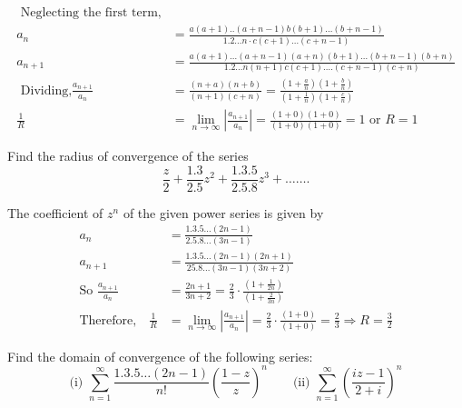 \begin{answer}
	\begin{align*}
\text{	Neglecting the first term,}\\
	a_{n}&=\frac{a(a+1) . .(a+n-1) b(b+1) \ldots(b+n-1)}{1.2 \ldots n \cdot c(c+1) \ldots(c+n-1)} \\
	a_{n+1}&=\frac{a(a+1) \ldots(a+n-1)(a+n)(b+1) \ldots(b+n-1)(b+n)}{1.2 \ldots n(n+1) c(c+1) \ldots .(c+n-1)(c+n)}\\
\text{	Dividing,} \frac{a_{n+1}}{a_{n}}&=\frac{(n+a)(n+b)}{(n+1)(c+n)}=\frac{\left(1+\frac{a}{n}\right)\left(1+\frac{b}{n}\right)}{\left(1+\frac{1}{n}\right)\left(1+\frac{c}{n}\right)}\\
	\frac{1}{R}&=\lim _{n \rightarrow \infty}\left|\frac{a_{n+1}}{a_{n}}\right|=\frac{(1+0)(1+0)}{(1+0)(1+0)}=1 \text { or } R=1
	\end{align*}
\end{answer}
\begin{exercise}
	Find the radius of convergence of the series
	$$
	\frac{z}{2}+\frac{1.3}{2.5} z^{2}+\frac{1.3 .5}{2.5 .8} z^{3}+\ldots \ldots .
	$$
\end{exercise}
\begin{answer}
	The coefficient of $z^{n}$ of the given power series is given by
	\begin{align*}
	a_{n}&=\frac{1.3 .5 \ldots(2 n-1)}{2.5 .8 \ldots(3 n-1)} \\
	a_{n+1}&=\frac{1.3 .5 \ldots(2 n-1)(2 n+1)}{25.8 \ldots(3 n-1)(3 n+2)}\\
	\text{So }\frac{a_{n+1}}{a_{n}}&=\frac{2 n+1}{3 n+2}=\frac{2}{3} \cdot \frac{\left(1+\frac{1}{2 n}\right)}{\left(1+\frac{2}{3 n}\right)}\\
	\text{Therefore,}\quad
	\frac{1}{R}&=\lim _{n \rightarrow \infty}\left|\frac{a_{n+1}}{a_{n}}\right|=\frac{2}{3} \cdot \frac{(1+0)}{(1+0)}=\frac{2}{3} \Rightarrow R=\frac{3}{2}
	\end{align*}
\end{answer}
\begin{exercise}
	 Find the domain of convergence of the following series:\\
	$$\text{(i) } \sum_{n=1}^{\infty} \frac{1.3 .5 \ldots(2 n-1)}{n !}\left(\frac{1-z}{z}\right)^{n}\qquad
	\text{(ii) }\sum_{n=1}^{\infty}\left(\frac{i z-1}{2+i}\right)^{n}$$
\end{exercise}
